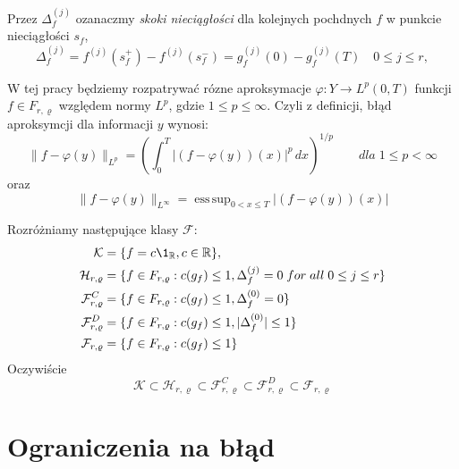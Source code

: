 \documentclass[oik, pdftex, robocza, man]{mgrwms}
\DeclareMathOperator*{\esssup}{ess\,sup}
\begin{document}
    Przez $\Delta_f^{(j)}$ ozanaczmy \emph{skoki nieciągłości} dla kolejnych pochdnych $f$ w punkcie nieciągłości $s_f$,
    \begin{equation*}
        \Delta_f^{(j)} = f^{(j)}(s_f^+) - f^{(j)}(s_f^-) = g_f^{(j)}(0) - g_f^{(j)}(T) \quad 0 \leq j \leq r,
    \end{equation*}

    W tej pracy będziemy rozpatrywać rózne aproksymacje $\varphi : Y \rightarrow L^p(0, T)$ funkcji $f \in F_{r, \varrho}$ względem normy $L^p$, gdzie $1 \leq p \leq \infty$. Czyli z definicji, błąd aproksymcji dla informacji $y$ wynosi:
    \begin{equation*}
        \|f-\varphi(y)\|_{L^p} = \left( \int_{0}^{T} |(f-\varphi(y))(x)|^p \,dx  \right)^{1/p} \qquad dla \; 1 \leq p < \infty
    \end{equation*}
    oraz
    \begin{equation*}
        \|f-\varphi(y)\|_{L^\infty} = \esssup_{0 < x \leq T} | (f - \varphi(y))(x) |
    \end{equation*}

    Rozróżniamy następujące klasy $\mathcal{F}$:
    \begin{equation*}
        \begin{split}
            \mathcal{K} & = \{f = c \1_{\R}, c \in \R \}, \\
            \mathcal{H}_{r, \varrho} & = \{ f \in F_{r, \varrho}: c(g_{f}) \leq 1, \Delta_{f}^{(j)} = 0 \; for\; all\; 0 \leq j \leq r\} \\
            \mathcal{F}_{r, \varrho}^{C} & = \{ f \in F_{r, \varrho}: c(g_{f}) \leq 1, \Delta_{f}^{(0)} = 0 \} \\
            \mathcal{F}_{r, \varrho}^{D} & = \{ f \in F_{r, \varrho}: c(g_{f}) \leq 1, | \Delta_{f}^{(0)} | \leq 1 \} \\
            \mathcal{F}_{r, \varrho} & = \{ f \in F_{r, \varrho}: c(g_{f}) \leq 1 \} \\
        \end{split}
    \end{equation*}
    Oczywiście
    \begin{equation*}
        \mathcal{K} \subset \mathcal{H}_{r, \varrho} \subset \mathcal{F}_{r, \varrho}^{C} \subset \mathcal{F}_{r, \varrho}^{D} \subset \mathcal{F}_{r, \varrho}
    \end{equation*}

\mgrclosechapter


\chapter{Ograniczenia na błąd}
\end{document}
